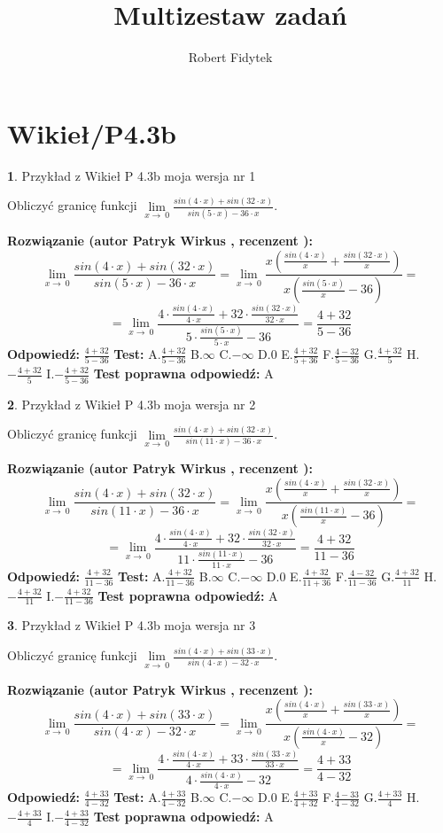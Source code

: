 \documentclass[12pt, a4paper]{article}
\title{Multizestaw zadań}
\author{Robert Fidytek}
\date{}
\theoremstyle{definition} %
\newtheorem{zad}{}
\newcommand{\kategoria}[1]{\section{#1}}
\newcommand{\zadStart}[1]{\begin{zad}#1\newline}
\newcommand{\zadStop}{\end{zad}}
\newcommand{\rozwStart}[2]{\noindent \textbf{Rozwiązanie (autor #1 , recenzent #2): }\newline}
\newcommand{\rozwStop}{\newline}
\newcommand{\odpStart}{\noindent \textbf{Odpowiedź:}\newline}
\newcommand{\odpStop}{\newline}
\newcommand{\testStart}{\noindent \textbf{Test:}\newline}
\newcommand{\testStop}{\newline}
\newcommand{\kluczStart}{\noindent \textbf{Test poprawna odpowiedź:}\newline}
\newcommand{\kluczStop}{\newline}
\begin{document}
\maketitle

\kategoria{Wikieł/P4.3b}


\zadStart{Przykład z Wikieł P 4.3b moja wersja nr 1}


Obliczyć granicę funkcji $\lim\limits_{x\to\ 0}\frac{sin(4 \cdot x)+sin(32 \cdot x)}{sin(5 \cdot x)-36 \cdot x}$.
\zadStop
\rozwStart{Patryk Wirkus}{}
$$\lim\limits_{x\to\ 0}\frac{sin(4 \cdot x)+sin(32 \cdot x)}{sin(5 \cdot x)-36 \cdot x}=\lim\limits_{x\to\ 0}\frac{x(\frac{sin(4 \cdot x)}{x}+\frac{sin(32 \cdot x)}{x})}{x(\frac{sin(5 \cdot x)}{x}-36)}=$$
$$=\lim\limits_{x\to\ 0}\frac{4 \cdot \frac{sin(4 \cdot x)}{4 \cdot x}+32 \cdot \frac{sin(32 \cdot x)}{32 \cdot x}}{5 \cdot \frac{sin(5 \cdot x)}{5 \cdot x}-36}=\frac{4+32}{5-36}$$
\rozwStop
\odpStart
$\frac{4+32}{5-36}$
\odpStop
\testStart
A.$\frac{4+32}{5-36}$
B.$\infty$
C.$-\infty$
D.$0$
E.$\frac{4+32}{5+36}$
F.$\frac{4-32}{5-36}$
G.$\frac{4+32}{5}$
H.$-\frac{4+32}{5}$
I.$-\frac{4+32}{5-36}$
\testStop
\kluczStart
A
\kluczStop



\zadStart{Przykład z Wikieł P 4.3b moja wersja nr 2}


Obliczyć granicę funkcji $\lim\limits_{x\to\ 0}\frac{sin(4 \cdot x)+sin(32 \cdot x)}{sin(11 \cdot x)-36 \cdot x}$.
\zadStop
\rozwStart{Patryk Wirkus}{}
$$\lim\limits_{x\to\ 0}\frac{sin(4 \cdot x)+sin(32 \cdot x)}{sin(11 \cdot x)-36 \cdot x}=\lim\limits_{x\to\ 0}\frac{x(\frac{sin(4 \cdot x)}{x}+\frac{sin(32 \cdot x)}{x})}{x(\frac{sin(11 \cdot x)}{x}-36)}=$$
$$=\lim\limits_{x\to\ 0}\frac{4 \cdot \frac{sin(4 \cdot x)}{4 \cdot x}+32 \cdot \frac{sin(32 \cdot x)}{32 \cdot x}}{11 \cdot \frac{sin(11 \cdot x)}{11 \cdot x}-36}=\frac{4+32}{11-36}$$
\rozwStop
\odpStart
$\frac{4+32}{11-36}$
\odpStop
\testStart
A.$\frac{4+32}{11-36}$
B.$\infty$
C.$-\infty$
D.$0$
E.$\frac{4+32}{11+36}$
F.$\frac{4-32}{11-36}$
G.$\frac{4+32}{11}$
H.$-\frac{4+32}{11}$
I.$-\frac{4+32}{11-36}$
\testStop
\kluczStart
A
\kluczStop



\zadStart{Przykład z Wikieł P 4.3b moja wersja nr 3}


Obliczyć granicę funkcji $\lim\limits_{x\to\ 0}\frac{sin(4 \cdot x)+sin(33 \cdot x)}{sin(4 \cdot x)-32 \cdot x}$.
\zadStop
\rozwStart{Patryk Wirkus}{}
$$\lim\limits_{x\to\ 0}\frac{sin(4 \cdot x)+sin(33 \cdot x)}{sin(4 \cdot x)-32 \cdot x}=\lim\limits_{x\to\ 0}\frac{x(\frac{sin(4 \cdot x)}{x}+\frac{sin(33 \cdot x)}{x})}{x(\frac{sin(4 \cdot x)}{x}-32)}=$$
$$=\lim\limits_{x\to\ 0}\frac{4 \cdot \frac{sin(4 \cdot x)}{4 \cdot x}+33 \cdot \frac{sin(33 \cdot x)}{33 \cdot x}}{4 \cdot \frac{sin(4 \cdot x)}{4 \cdot x}-32}=\frac{4+33}{4-32}$$
\rozwStop
\odpStart
$\frac{4+33}{4-32}$
\odpStop
\testStart
A.$\frac{4+33}{4-32}$
B.$\infty$
C.$-\infty$
D.$0$
E.$\frac{4+33}{4+32}$
F.$\frac{4-33}{4-32}$
G.$\frac{4+33}{4}$
H.$-\frac{4+33}{4}$
I.$-\frac{4+33}{4-32}$
\testStop
\kluczStart
A
\kluczStop
\end{document}
